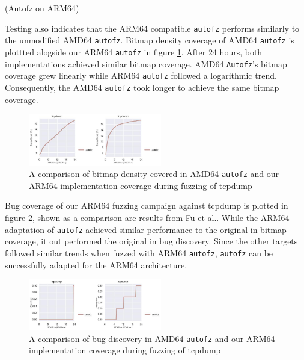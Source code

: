 \substection(Autofz on ARM64)

Testing also indicates that the ARM64 compatible \texttt{autofz} performs similarly to the unmodified AMD64 \texttt{autofz}. 
Bitmap density coverage of AMD64 \texttt{autofz} is plottted alogside our ARM64 \texttt{autofz} in figure 
\ref{fig:tcpdump_compare_orig_arm64}. After 24 hours, both implementations achieved similar bitmap coverage.
AMD64 \texttt{Autofz}'s bitmap coverage grew linearly while ARM64 \texttt{autofz} followed a logarithmic trend. Consequently, 
the AMD64 \texttt{autofz} took longer to achieve the same bitmap coverage. 

\begin{figure}
    \includegraphics[width=0.52\textwidth]{figs/tcpdump_compare_orig_arm64.png}
    \centering
    \caption{A comparison of bitmap density covered in AMD64 \texttt{autofz} and our ARM64 implementation
    coverage during fuzzing of tcpdump}
    \label{fig:tcpdump_compare_orig_arm64}
\end{figure}

Bug coverage of our ARM64 fuzzing campaign against tcpdump is plotted in figure \ref{figs:tcp_compare_orig_arm64_ub.png}, 
shown as a comparison are results from Fu et al.\cite{fu_autofz_2023}. While the ARM64 adaptation of \texttt{autofz} achieved similar
performance to the original in bitmap coverage, it out performed the original in bug discovery. Since the other targets followed similar trends
when fuzzed with ARM64 \texttt{autofz}, \texttt{autofz} can be successfully adapted for the ARM64 architecture.

\begin{figure}
    \includegraphics[width=0.52\textwidth]{figs/tcpdump_compare_orig_arm64_ub.png}
    \centering
    \caption{A comparison of bug discovery in AMD64 \texttt{autofz} and our ARM64 implementation
    coverage during fuzzing of tcpdump}
    \label{figs:tcp_compare_orig_arm64_ub.png}
\end{figure}

